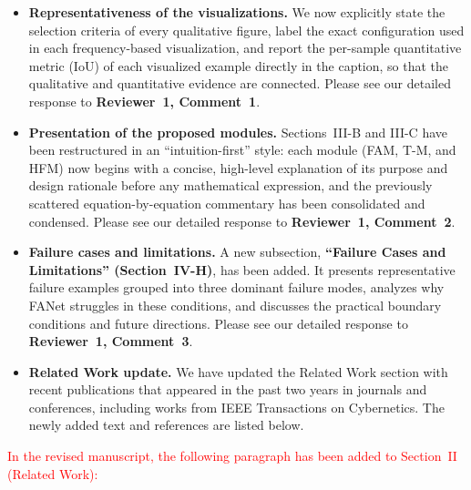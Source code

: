 \documentclass[lettersize,journal,onecolumn,12pt]{IEEEtran}
\begin{document}
\begin{itemize}
    \item \textbf{Representativeness of the visualizations.}
    We now explicitly state the selection criteria of every qualitative figure, label the exact configuration used in
    each frequency-based visualization, and report the per-sample quantitative metric (IoU) of each visualized example
    directly in the caption, so that the qualitative and quantitative evidence are connected.
    Please see our detailed response to \textbf{Reviewer~1, Comment~1}.

    \item \textbf{Presentation of the proposed modules.}
    Sections~III-B and III-C have been restructured in an ``intuition-first'' style: each module (FAM, T-M, and HFM)
    now begins with a concise, high-level explanation of its purpose and design rationale before any mathematical
    expression, and the previously scattered equation-by-equation commentary has been consolidated and condensed.
    Please see our detailed response to \textbf{Reviewer~1, Comment~2}.

    \item \textbf{Failure cases and limitations.}
    A new subsection, \textbf{``Failure Cases and Limitations'' (Section~IV-H)}, has been added. It presents
    representative failure examples grouped into three dominant failure modes, analyzes why FANet struggles in these
    conditions, and discusses the practical boundary conditions and future directions.
    Please see our detailed response to \textbf{Reviewer~1, Comment~3}.

    \item \textbf{Related Work update.}
    We have updated the Related Work section with recent publications that appeared in the past two years in
    journals and conferences, including works from IEEE Transactions on Cybernetics.
    The newly added text and references are listed below.
\end{itemize}

\textcolor{red}{In the revised manuscript, the following paragraph has been added to Section~II (Related Work):}
\end{document}
